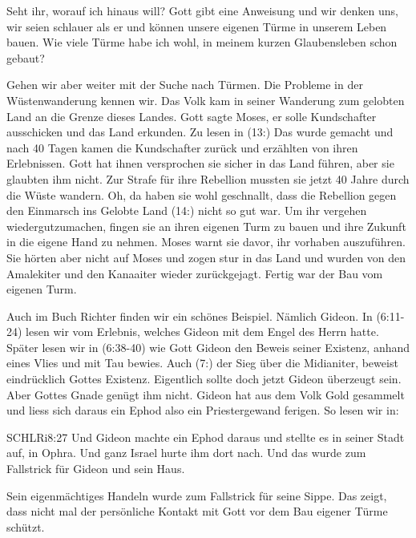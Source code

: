 \documentclass[14pt]{../../inc/mybib}
\newenvironment{block}[1][]{%
  \vspace{1.5em}%
  \noindent\textbf{#1}\par%
  \vspace{0.0em}%
}{%
  \vspace{1em}%
}
\begin{document}
\begin{block}
    Seht ihr, worauf ich hinaus will? Gott gibt eine Anweisung und wir denken uns, wir seien schlauer als er und können unsere eigenen Türme in unserem Leben bauen. Wie viele Türme habe ich wohl, in meinem kurzen Glaubensleben schon gebaut?
\end{block}
\begin{block}
    Gehen wir aber weiter mit der Suche nach Türmen. Die Probleme in der Wüstenwanderung kennen wir. Das Volk kam in seiner Wanderung zum gelobten Land an die Grenze dieses Landes. Gott sagte Moses, er solle Kundschafter ausschicken und das Land erkunden. Zu lesen in (13:) Das wurde gemacht und nach 40 Tagen kamen die Kundschafter zurück und erzählten von ihren Erlebnissen. Gott hat ihnen versprochen sie sicher in das Land führen, aber sie glaubten ihm nicht. Zur Strafe für ihre Rebellion mussten sie jetzt 40 Jahre durch die Wüste wandern. Oh, da haben sie wohl geschnallt, dass die Rebellion gegen den Einmarsch ins Gelobte Land (14:) nicht so gut war. Um ihr vergehen wiedergutzumachen, fingen sie an ihren eigenen Turm zu bauen und ihre Zukunft in die eigene Hand zu nehmen. Moses warnt sie davor, ihr vorhaben auszuführen. Sie hörten aber nicht auf Moses und zogen stur in das Land und wurden von den Amalekiter und den Kanaaiter wieder zurückgejagt. Fertig war der Bau vom eigenen Turm.
\end{block}
\begin{block}
    Auch im Buch Richter finden wir ein schönes Beispiel. Nämlich Gideon. In (6:11-24) lesen wir vom Erlebnis, welches Gideon mit dem Engel des Herrn hatte. Später lesen wir in (6:38-40) wie Gott Gideon den Beweis seiner Existenz, anhand eines Vlies und mit Tau bewies. Auch (7:) der Sieg über die Midianiter, beweist eindrücklich Gottes Existenz. Eigentlich sollte doch jetzt Gideon überzeugt sein. Aber Gottes Gnade genügt ihm nicht. Gideon hat aus dem Volk Gold gesammelt und liess sich daraus ein Ephod also ein Priestergewand ferigen. So lesen wir in:
    \begin{bibelbox}{SCHL}{Ri}{8:27}
        Und Gideon machte ein Ephod daraus und stellte es in seiner Stadt auf, in Ophra. Und ganz Israel hurte ihm dort nach. Und das wurde zum Fallstrick für Gideon und sein Haus.
    \end{bibelbox} 
    Sein eigenmächtiges Handeln wurde zum Fallstrick für seine Sippe. Das zeigt, dass nicht mal der persönliche Kontakt mit Gott vor dem Bau eigener Türme schützt.
\end{block}
\end{document}
